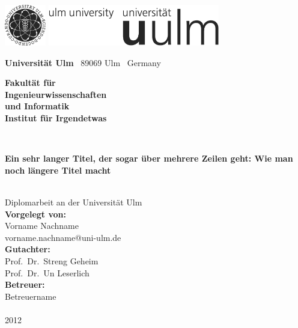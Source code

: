 \documentclass[a4paper,10pt,bibtotoc,twoside,openright,pointlessnumbers,normalheadings,DIV=9
]{scrbook}
\makeatletter
\newcommand{\fullname}{Vorname Nachname}
\newcommand{\email}{vorname.nachname@uni-ulm.de}
\newcommand{\titel}{Ein sehr langer Titel, der sogar über mehrere Zeilen geht: Wie man noch längere Titel macht}
\newcommand{\jahr}{2012}
\newcommand{\gutachterA}{Prof.\ Dr.\ Streng Geheim}
\newcommand{\gutachterB}{Prof.\ Dr.\ Un Leserlich}
\newcommand{\betreuer}{Betreuername}
\newcommand{\fakultaet}{Ingenieurwissenschaften\\und Informatik}
\newcommand{\institut}{Institut für Irgendetwas}
\makeatother
\begin{document}
\frontmatter

\thispagestyle{empty}
\begin{addmargin*}[4mm]{-32mm}

\includegraphics[height=1.8cm]{images/unilogo_bild}
\hfill
\includegraphics[height=1.8cm]{images/unilogo_wort}\\[1em]

{\footnotesize
{\bfseries Universität Ulm} \textbar ~89069 Ulm \textbar ~Germany
\hfill\parbox[t]{42mm}{\bfseries Fakultät für\\
\fakultaet\\
\mdseries \institut}\\[2cm]

\parbox{140mm}{\bfseries \huge \titel}\\[0.5em]
{\footnotesize Diplomarbeit an der Universität Ulm}\\[3em]

{\footnotesize \bfseries Vorgelegt von:}\\
{\footnotesize \fullname\\\email}\\[2em]
{\footnotesize \bfseries Gutachter:}\\                     
{\footnotesize\gutachterA\\
\gutachterB}\\[2em]
{\footnotesize \bfseries Betreuer:}\\ 
{\footnotesize\betreuer}\\\\
{\footnotesize\jahr}
}
\end{addmargin*}
\end{document}
